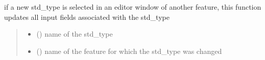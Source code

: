 \documentclass[letterpaper,10pt,english]{sphinxmanual}
\begin{document}
\begin{fulllineitems}
\label{\detokenize{docs_gui/js_api/network_editor/display_editable_network_features:updateStdTypeFeaturesInEditor}}
\pysigstartsignatures
{}
\pysigstopsignatures
\sphinxAtStartPar
if a new std\_type is selected in an editor window of another feature, this function updates all input fields associated with the std\_type
\begin{quote}\begin{description}
\begin{itemize}
\item {} 
\sphinxAtStartPar
{} () \textendash{} name of the std\_type

\item {} 
\sphinxAtStartPar
{} () \textendash{} name of the feature for which the std\_type was changed

\end{itemize}

\end{description}\end{quote}

\end{fulllineitems}

\end{document}
